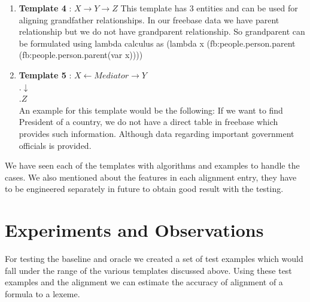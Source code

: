 \documentclass[12pt, a4paper]{article}
\begin{document}
\begin{enumerate}
{\bf formula} = \\"(lambda x (fb:people.person.spouse \\(fb:people.person.gender.female(var x))))"\\
{\bf lexeme} = "wife of"\\
{\bf source} = "ALIGNMENT"\\
{\bf features} = \{FB\_typed\_size :aaa, Intersection\_size\_typed:bbb, "NL-size":ccc\}

The algorithm used to align the formula is still similar to the ones discussed above but we now use a unique lambda function which would represent the formula. This is yet to be implemented and tested.

A few more templates which would be our targets for the end project are discussed with an example.

\item {\bf Template 4} : $X \rightarrow Y \rightarrow Z$
This template has 3 entities and can be used for aligning grandfather relationships. In our freebase data we have parent relationship but we do not have grandparent relationship. So grandparent can be formulated using lambda calculus as (lambda x (fb:people.person.parent (fb:people.person.parent(var x))))

\item {\bf Template 5} : $X\leftarrow Mediator \rightarrow Y$\\
.\qquad\qquad$\downarrow$\\
.\qquad\qquad$Z$\\
An example for this template would be the following: If we want to find President of a country, we do not have a direct table in freebase which provides such information. Although data regarding important government officials is provided.
	
\end{enumerate}

We have seen each of the templates with algorithms and examples to handle the cases. We also mentioned about the features in each alignment entry, they have to be engineered separately in future to obtain good result with the testing. 

\section{Experiments and Observations}
For testing the baseline and oracle we created a set of test examples which would fall under the range of the various templates discussed above. Using these test examples and the alignment we can estimate the accuracy of alignment of a formula to a lexeme.
\end{document}
